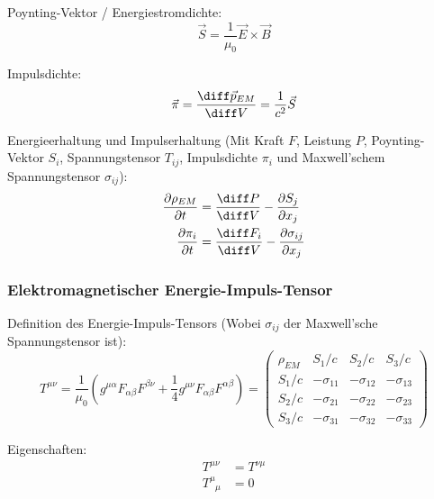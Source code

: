 \documentclass[11pt]{article}
\numberwithin{equation}{section}
\begin{document}
        Poynting-Vektor / Energiestromdichte:
        \begin{equation}
          \vec{S} = \frac{1}{\mu_0}\vec{E}\times\vec{B}
        \end{equation}

        Impulsdichte:
        \begin{equation}
          \vec{\pi} = \tder{\vec{p}_{EM}}{V} = \frac{1}{c^2}\vec{S}
        \end{equation}

        Energieerhaltung und Impulserhaltung (Mit Kraft $F$, Leistung $P$, Poynting-Vektor $S_i$, Spannungstensor $T_{ij}$, Impulsdichte $\pi_i$ und Maxwell'schem Spannungstensor $\sigma_{ij}$):
        \begin{equation}
          \begin{aligned}
            \pder{\rho_{EM}}{t} &= \tder{P}{V} - \pder{S_j}{x_j} \\
            \pder{\pi_i}{t} &=  \tder{F_i}{V} - \pder{\sigma_{ij}}{x_j}
          \end{aligned}
        \end{equation}

      \subsubsection{Elektromagnetischer Energie-Impuls-Tensor}
        Definition des Energie-Impuls-Tensors (Wobei $\sigma_{ij}$ der Maxwell'sche Spannungstensor ist):
        \begin{equation}
          T^{\mu\nu} = \frac{1}{\mu_0}\left(g^{\mu\alpha} F_{\alpha\beta} F^{\beta\nu} +\frac{1}{4}g^{\mu\nu} F_{\alpha\beta} F^{\alpha\beta} \right)
          = \left( \begin{matrix}
            \rho_{EM} & S_1/c & S_2/c & S_3/c \\
            S_1/c & -\sigma_{11} & -\sigma_{12} & -\sigma_{13} \\
            S_2/c  & -\sigma_{21} & -\sigma_{22} & -\sigma_{23} \\
            S_3/c & -\sigma_{31} & -\sigma_{32} & -\sigma_{33}
          \end{matrix} \right)
        \end{equation}

        Eigenschaften:
        \begin{equation}
          \begin{aligned}
            T^{\mu\nu} &= T^{\nu\mu} \\
            T^\mu_{\phantom{\mu}\mu} &= 0 \\
          \end{aligned}
        \end{equation}
\end{document}
